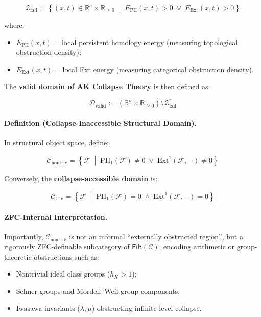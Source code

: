 \documentclass[11pt]{article}
\begin{document}
\[
\mathcal{Z}_{\mathrm{fail}} = \left\{ (x,t) \in \mathbb{R}^n \times \mathbb{R}_{\geq 0} \;\middle|\; E_{\mathrm{PH}}(x,t) > 0 \;\lor\; E_{\mathrm{Ext}}(x,t) > 0 \right\}
\]

where:

\begin{itemize}
    \item $E_{\mathrm{PH}}(x,t)$ = local persistent homology energy (measuring topological obstruction density);
    \item $E_{\mathrm{Ext}}(x,t)$ = local Ext energy (measuring categorical obstruction density).
\end{itemize}

The \textbf{valid domain of AK Collapse Theory} is then defined as:

\[
\mathcal{D}_{\mathrm{valid}} := \left( \mathbb{R}^n \times \mathbb{R}_{\geq 0} \right) \setminus \overline{\mathcal{Z}_{\mathrm{fail}}}
\]

\paragraph{Definition (Collapse-Inaccessible Structural Domain).}

In structural object space, define:

\[
\mathcal{C}_{\mathrm{nontriv}} = \left\{ \mathcal{F} \;\middle|\; \mathrm{PH}_1(\mathcal{F}) \neq 0 \;\lor\; \mathrm{Ext}^1(\mathcal{F}, -) \neq 0 \right\}
\]

Conversely, the \textbf{collapse-accessible domain} is:

\[
\mathcal{C}_{\mathrm{triv}} = \left\{ \mathcal{F} \;\middle|\; \mathrm{PH}_1(\mathcal{F}) = 0 \;\land\; \mathrm{Ext}^1(\mathcal{F}, -) = 0 \right\}
\]

\paragraph{ZFC-Internal Interpretation.}

Importantly, $\mathcal{C}_{\mathrm{nontriv}}$ is not an informal “externally obstructed region”, but a rigorously ZFC-definable subcategory of $\mathsf{Filt}(\mathcal{C})$, encoding arithmetic or group-theoretic obstructions such as:

\begin{itemize}
    \item Nontrivial ideal class groups ($h_K > 1$);
    \item Selmer groups and Mordell–Weil group components;
    \item Iwasawa invariants ($\lambda, \mu$) obstructing infinite-level collapse.
\end{itemize}
\end{document}
